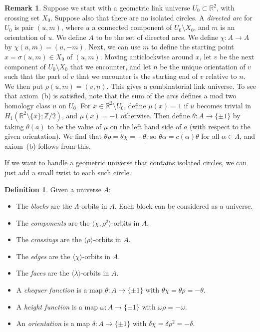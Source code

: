 \documentclass{amsart}
\newcommand{\Z}         {{\mathbb{Z}}}
\newcommand{\R}         {{\mathbb{R}}}
\newcommand{\sm}        {\setminus}
\newcommand{\Lm}        {\Lambda}
\newcommand{\al}        {\alpha}
\newcommand{\dl}        {\delta}
\newcommand{\tht}       {\theta}
\newcommand{\lm}        {\lambda}
\newcommand{\om}        {\omega}
\newcommand{\sg}        {\sigma}
\newcommand{\ip}[1]     {\langle #1\rangle}
\renewcommand{\:}{\colon}
\theoremstyle{definition}
\newtheorem{remark}[theorem]{Remark}
\newtheorem{definition}[theorem]{Definition}
\begin{document}
\begin{remark}
 Suppose we start with a geometric link universe $U_0\subset\R^2$,
 with crossing set $X_0$.  Suppose also that there are no isolated
 circles.  A \emph{directed arc} for $U_0$ is pair $(u,m)$, where $u$
 a connected component of $U_0\sm X_0$, and $m$ is an orientation of
 $u$.  We define $A$ to be the set of directed arcs.  We define
 $\chi\:A\to A$ by $\chi(u,m)=(u,-m)$.  Next, we can use $m$ to define
 the starting point $x=\sg(u,m)\in X_0$ of $(u,m)$.  Moving
 anticlockwise around $x$, let $v$ be the next component of
 $U_0\sm X_0$ that we encounter, and let $n$ be the unique orientation
 of $v$ such that the part of $v$ that we encounter is the starting
 end of $v$ relative to $n$.  We then put $\rho(u,m)=(v,n)$.  This
 gives a combinatorial link universe.  To see that axiom~(b) is
 satisfied, note that the sum of the arcs defines a mod two homology
 class $u$ on $U_0$.  For $x\in\R^2\sm U_0$, define $\mu(x)=1$ if $u$
 becomes trivial in $H_1(\R^2\sm\{x\};\Z/2)$, and $\mu(x)=-1$
 otherwise.  Then define $\tht\:A\to\{\pm 1\}$ by taking $\tht(a)$ to
 be the value of $\mu$ on the left hand side of $a$ (with respect to
 the given orientation).  We find that $\tht\rho=\tht\chi=-\tht$, so
 $\tht\al=c(\al)\tht$ for all $\al\in\Lm$, and axiom~(b) follows from
 this.

 If we want to handle a geometric universe that contains isolated
 circles, we can just add a small twist to each such circle.  
\end{remark}

\begin{definition}
 Given a universe $A$:
 \begin{itemize}
  \item The \emph{blocks} are the $\Lm$-orbits in $A$.  Each block
   can be considered as a universe.
  \item The \emph{components} are the $\ip{\chi,\rho^2}$-orbits in $A$.
  \item The \emph{crossings} are the $\ip{\rho}$-orbits in $A$.
  \item The \emph{edges} are the $\ip{\chi}$-orbits in $A$.
  \item The \emph{faces} are the $\ip{\lm}$-orbits in $A$.
  \item A \emph{chequer function} is a map $\tht\:A\to\{\pm 1\}$ with
   $\tht\chi=\tht\rho=-\tht$.
  \item A \emph{height function} is a map $\om\:A\to\{\pm 1\}$ with
   $\om\rho=-\om$.
  \item An \emph{orientation} is a map $\dl\:A\to\{\pm 1\}$ with
   $\dl\chi=\dl\rho^2=-\dl$.
 \end{itemize}
\end{definition}
\end{document}
